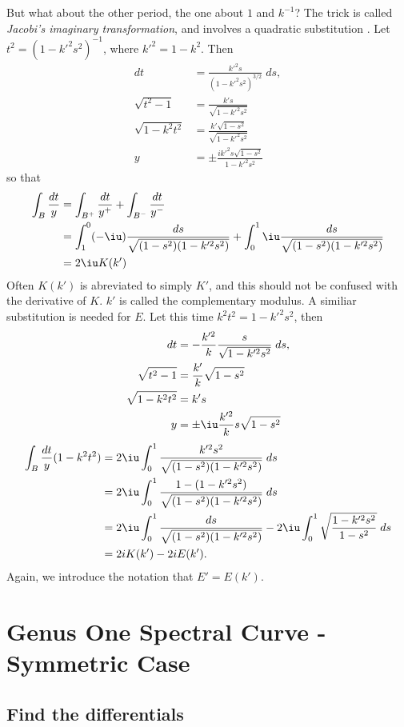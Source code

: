\documentclass{article}
\begin{document}
But what about the other period, the one about $1$ and $k^{-1}$? The trick is called {\it Jacobi's imaginary transformation}, and involves a quadratic substitution \cite{whittaker02}. Let $t^2 = (1-k'^2 s^2)^{-1}$, where $k'^2 = 1 - k^2$. Then
\begin{align*}
dt &= \frac{k'^2 s}{(1-k'^2 s^2)^{3/2}}\;ds, \\
\sqrt{t^2 - 1} &= \frac{k's}{\sqrt{1-k'^2 s^2}} \\
\sqrt{1 - k^2 t^2} &= \frac{k' \sqrt{1-s^2}}{\sqrt{1-k'^2 s^2}} \\
y &= \pm \frac{i k'^2 s \sqrt {1-s^2}}{1-k'^2 s^2}
\end{align*}
so that
\begin{align*}
\int_B \frac{dt}{y}
&= \int_{B^+} \frac{dt}{y^+} + \int_{B^-} \frac{dt}{y^-} \\
&= \int_1^0 (-\iu) \frac{ds}{\sqrt{(1-s^2)(1-k'^2 s^2)}} + \int_0^1 \iu \frac{ds}{\sqrt{(1-s^2)(1-k'^2 s^2)}}\\
&= 2\iu K(k')
\end{align*}
Often $K(k')$ is abreviated to simply $K'$, and this should not be confused with the derivative of $K$. $k'$ is called the complementary modulus. A similiar substitution is needed for $E$. Let this time $k^2 t^2 = 1-k'^2 s^2$, then
\begin{align*}
dt &= -\frac{k'^2}{k} \frac{s}{\sqrt{1-k'^2 s^2}}\;ds,\\
\sqrt{t^2 - 1} &= \frac{k'}{k}\sqrt{1-s^2} \\
\sqrt{1 - k^2 t^2} &= k's\\
y &= \pm \iu \frac{k'^2}{k}s\sqrt{1-s^2}
\end{align*}
\begin{align*}
\int_B \frac{dt}{y}(1-k^2t^2)
&= 2\iu \int_0^1 \frac{k'^2 s^2}{\sqrt{(1-s^2)(1-k'^2 s^2)}}\;ds \\
&= 2\iu \int_0^1 \frac{1-(1-k'^2 s^2)}{\sqrt{(1-s^2)(1-k'^2 s^2)}}\;ds \\
&= 2\iu \int_0^1 \frac{ds}{\sqrt{(1-s^2)(1-k'^2 s^2)}} - 2\iu \int_0^1 \sqrt{\frac{1-k'^2 s^2}{1-s^2}}\;ds\\
&= 2iK(k') - 2iE(k').
\end{align*}
Again, we introduce the notation that $E' = E(k')$.

\section{Genus One Spectral Curve - Symmetric Case}
\subsection{Find the differentials}
\end{document}
